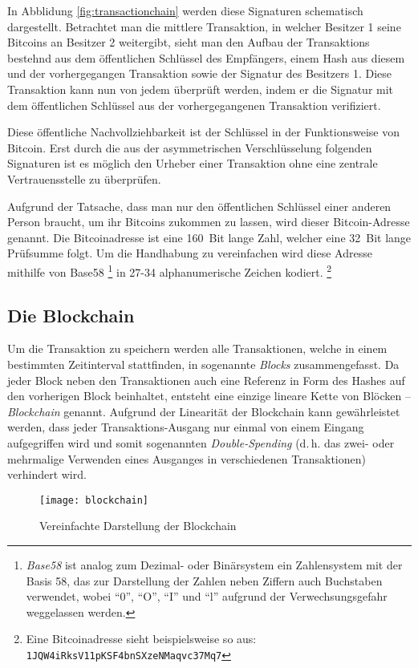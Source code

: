 In Abblidung \ref{fig:transactionchain} werden diese Signaturen schematisch dargestellt.
Betrachtet man die mittlere Transaktion, in welcher Besitzer 1 seine Bitcoins an Besitzer 2 weitergibt, sieht man den Aufbau der Transaktions bestehnd aus dem öffentlichen Schlüssel des Empfängers, einem Hash aus diesem und der vorhergegangen Transaktion sowie der Signatur des Besitzers 1.
Diese Transaktion kann nun von jedem überprüft werden, indem er die Signatur mit dem öffentlichen Schlüssel aus der vorhergegangenen Transaktion verifiziert.

Diese öffentliche Nachvollziehbarkeit ist der Schlüssel in der Funktionsweise von Bitcoin.
Erst durch die aus der asymmetrischen Verschlüsselung folgenden Signaturen ist es möglich den Urheber einer Transaktion ohne eine zentrale Vertrauensstelle zu überprüfen.

Aufgrund der Tatsache, dass man nur den öffentlichen Schlüssel einer anderen Person braucht, um ihr Bitcoins zukommen zu lassen, wird dieser Bitcoin-Adresse genannt.
Die Bitcoinadresse ist eine 160~Bit lange Zahl, welcher eine 32~Bit lange Prüfsumme folgt.
Um die Handhabung zu vereinfachen wird diese Adresse mithilfe von Base58%
\footnote{\emph{Base58} ist analog zum Dezimal- oder Binärsystem ein Zahlensystem mit der Basis 58, das zur Darstellung der Zahlen neben Ziffern auch Buchstaben verwendet, wobei "`0"', "`O"', "`I"' und "`l"' aufgrund der Verwechsungsgefahr weggelassen werden.}
in 27-34 alphanumerische Zeichen kodiert.%
\footnote{Eine Bitcoinadresse sieht beispielsweise so aus: \texttt{1JQW4iRksV11pKSF4bnSXzeNMaqvc37Mq7}}

\subsection{Die Blockchain}

Um die Transaktion zu speichern werden alle Transaktionen, welche in einem bestimmten Zeitinterval stattfinden, in sogenannte \emph{Blocks} zusammengefasst.
Da jeder Block neben den Transaktionen auch eine Referenz in Form des Hashes auf den vorherigen Block beinhaltet, entsteht eine einzige lineare Kette von Blöcken -- \emph{Blockchain} genannt.
Aufgrund der Linearität der Blockchain kann gewährleistet werden, dass jeder Transaktions-Ausgang nur einmal von einem Eingang aufgegriffen wird und somit sogenannten \emph{Double-Spending} (d.\,h. das zwei- oder mehrmalige Verwenden eines Ausganges in verschiedenen Transaktionen) verhindert wird.

\begin{figure}[htb]
    \begin{center}
        \texttt{[image: blockchain]}
        \caption{Vereinfachte Darstellung der Blockchain \parencite[3]{nakamoto}}
        \label{fig:blockchain}
    \end{center}
\end{figure}

